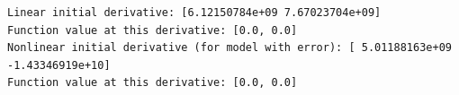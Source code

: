 \documentclass[11pt]{article}
\begin{document}
    \begin{Verbatim}[commandchars=\\\{\}]
Linear initial derivative: [6.12150784e+09 7.67023704e+09]
Function value at this derivative: [0.0, 0.0]
Nonlinear initial derivative (for model with error): [ 5.01188163e+09
-1.43346919e+10]
Function value at this derivative: [0.0, 0.0]
    \end{Verbatim}

    \begin{center}
    \end{center}
    { \hspace*{\fill} \\}
    
    \begin{center}
    \end{center}
    { \hspace*{\fill} \\}
    
\end{document}
